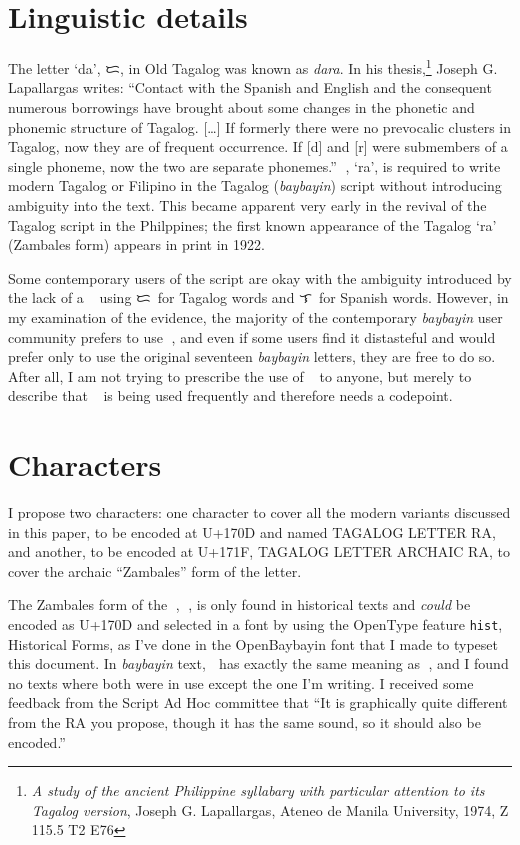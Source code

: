 \documentclass[a4paper,pagesize,openany,14pt,parskip=never]{scrbook}
\newcommand{\≈}{$\approx$}
\newcommand{\la}{{\baybayin ᜎ}}
\newcommand{\da}{{\baybayin ᜇ}}
\newcommand{\ra}{{\baybayin ᜍ}}
\begin{document}
\section{Linguistic details}
The letter `da', {\baybayin ᜇ}, in Old Tagalog was known as {\em dara}. In his thesis,\footnote{{\em A study of the ancient Philippine syllabary with particular attention to its Tagalog version}, Joseph G. Lapallargas, Ateneo de Manila University, 1974, Z 115.5 T2 E76} Joseph G. Lapallargas writes: ``Contact with the Spanish and English and the consequent numerous borrowings have brought about some changes in the phonetic and phonemic structure of Tagalog. [\ldots] If formerly there were no prevocalic clusters in Tagalog, now they are of frequent occurrence. If [d] and [r] were submembers of a single phoneme, now the two are separate phonemes.'' {\baybayin ᜍ}, `ra', is required to write modern Tagalog or Filipino in the Tagalog ({\em baybayin}) script without introducing ambiguity into the text. This became apparent very early in the revival of the Tagalog script in the Philppines; the first known appearance of the Tagalog `ra' (Zambales form) appears in print in 1922.

Some contemporary users of the script are okay with the ambiguity introduced by the lack of a \ra\, using \da\ for Tagalog words and \la\ for Spanish words. However, in my examination of the evidence, the majority of the contemporary {\em baybayin} user community prefers to use \ra, and even if some users find it distasteful and would prefer only to use the original seventeen {\em baybayin} letters, they are free to do so. After all, I am not trying to prescribe the use of \ra\ to anyone, but merely to describe that \ra\ is being used frequently and therefore needs a codepoint.


\section{Characters}
I propose two characters: one character to cover all the modern variants discussed in this paper, to be encoded at U+170D and named \textsf{TAGALOG LETTER RA}, and another, to be encoded at U+171F, \textsf{TAGALOG LETTER ARCHAIC RA}, to cover the archaic ``Zambales'' form of the letter.

The Zambales form of the {\baybayin ᜍ}, {\baybayinh ᜍ}, is only found in historical texts and {\em could} be encoded as U+170D and selected in a font by using the OpenType feature \texttt{hist}, \textsf{Historical Forms}, as I've done in the OpenBaybayin font that I made to typeset this document. In {\em baybayin} text, {\baybayinh ᜍ} has exactly the same meaning as {\baybayin ᜍ}, and I found no texts where both were in use except the one I'm writing. I received some feedback from the Script Ad Hoc committee that ``It is graphically quite different from the RA you propose, though it has the same sound, so it should also be encoded.''
\end{document}
